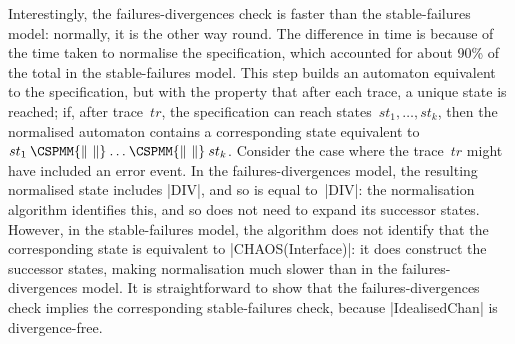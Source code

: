 Interestingly, the failures-divergences check is faster than the
stable-failures model: normally, it is the other way round.  The difference in
time is because of the time taken to normalise the specification, which
accounted for about 90\% of the total in the stable-failures model.  This step
builds an automaton equivalent to the specification, but with the property
that after each trace, a unique state is reached; if, after trace~$tr$, the
specification can reach states~$st_1,\ldots,st_k$, then the normalised
automaton contains a corresponding state equivalent to $st_1
\mathbin{\CSPMM{\|~\|}} \ldots \mathbin{\CSPMM{\|~\|}} st_k$.  Consider the
case where the trace~$tr$ might have included an error event.  In the
failures-divergences model, the resulting normalised state includes |DIV|, and
so is equal to~|DIV|: the normalisation algorithm identifies this, and so does
not need to expand its successor states.  However, in the stable-failures
model, the algorithm does not identify that the corresponding state is
equivalent to |CHAOS(Interface)|: it does construct the successor states,
making normalisation much slower than in the failures-divergences model.  It
is straightforward to show that the failures-divergences check implies the
corresponding stable-failures check, because |IdealisedChan| is
divergence-free.


